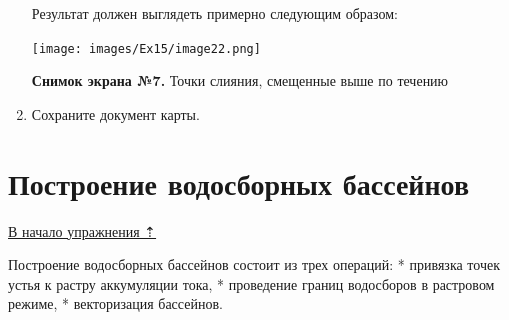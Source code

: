 \documentclass[12pt,]{book}
\begin{document}
\begin{enumerate}
  Результат должен выглядеть примерно следующим образом:

  \texttt{[image: images/Ex15/image22.png]}

  \textbf{Снимок экрана №7.} Точки слияния, смещенные выше по течению
\item
  Сохраните документ карты.
\end{enumerate}

\hypertarget{dem-watersheds}{%
\section{Построение водосборных бассейнов}\label{dem-watersheds}}

\protect\hyperlink{dem}{В начало упражнения ⇡}

Построение водосборных бассейнов состоит из трех операций:
* привязка точек устья к растру аккумуляции тока,
* проведение границ водосборов в растровом режиме,
* векторизация бассейнов.
\end{document}
